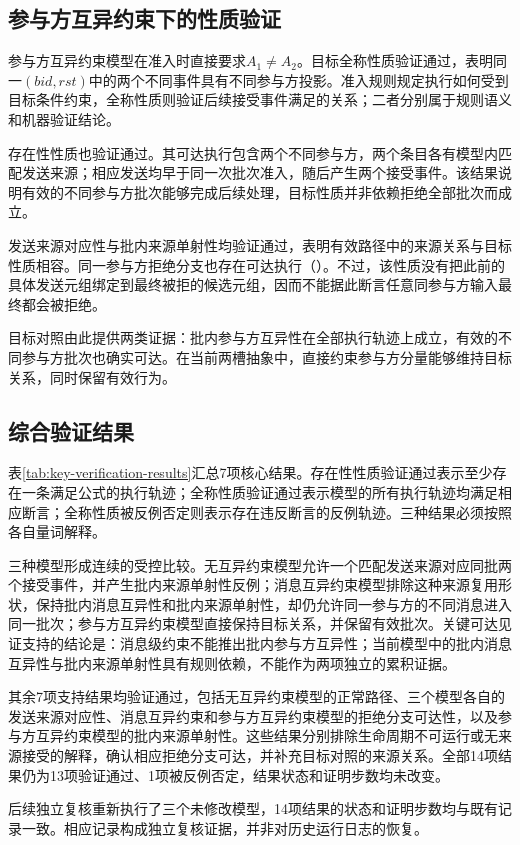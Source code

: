 \subsection{参与方互异约束下的性质验证}
\label{subsec:party-results}

参与方互异约束模型在准入时直接要求$A_1\neq A_2$。目标全称性质验证通过，表明同一$(\mathit{bid},\mathit{rst})$中的两个不同\receiveraccept 事件具有不同参与方投影。准入规则规定执行如何受到目标条件约束，全称性质则验证后续接受事件满足的关系；二者分别属于规则语义和机器验证结论。

存在性性质也验证通过。其可达执行包含两个不同参与方，两个条目各有模型内匹配发送来源；相应发送均早于同一次批次准入，随后产生两个接受事件。该结果说明有效的不同参与方批次能够完成后续处理，目标性质并非依赖拒绝全部批次而成立。

发送来源对应性与批内来源单射性均验证通过，表明有效路径中的来源关系与目标性质相容。同一参与方拒绝分支也存在可达执行（）。不过，该性质没有把此前的具体发送元组绑定到最终被拒的候选元组，因而不能据此断言任意同参与方输入最终都会被拒绝。

目标对照由此提供两类证据：批内参与方互异性在全部执行轨迹上成立，有效的不同参与方批次也确实可达。在当前两槽抽象中，直接约束参与方分量能够维持目标关系，同时保留有效行为。

\subsection{综合验证结果}
\label{subsec:combined-results}

表\ref{tab:key-verification-results}汇总7项核心结果。存在性性质验证通过表示至少存在一条满足公式的执行轨迹；全称性质验证通过表示模型的所有执行轨迹均满足相应断言；全称性质被反例否定则表示存在违反断言的反例轨迹。三种结果必须按照各自量词解释。



三种模型形成连续的受控比较。无互异约束模型允许一个匹配发送来源对应同批两个接受事件，并产生批内来源单射性反例；消息互异约束模型排除这种来源复用形状，保持批内消息互异性和批内来源单射性，却仍允许同一参与方的不同消息进入同一批次；参与方互异约束模型直接保持目标关系，并保留有效批次。关键可达见证支持的结论是：消息级约束不能推出批内参与方互异性；当前模型中的批内消息互异性与批内来源单射性具有规则依赖，不能作为两项独立的累积证据。

其余7项支持结果均验证通过，包括无互异约束模型的正常路径、三个模型各自的发送来源对应性、消息互异约束和参与方互异约束模型的拒绝分支可达性，以及参与方互异约束模型的批内来源单射性。这些结果分别排除生命周期不可运行或无来源接受的解释，确认相应拒绝分支可达，并补充目标对照的来源关系。全部14项结果仍为13项验证通过、1项被反例否定，结果状态和证明步数均未改变。

后续独立复核重新执行了三个未修改模型，14项结果的状态和证明步数均与既有记录一致。相应记录构成独立复核证据，并非对历史运行日志的恢复。

